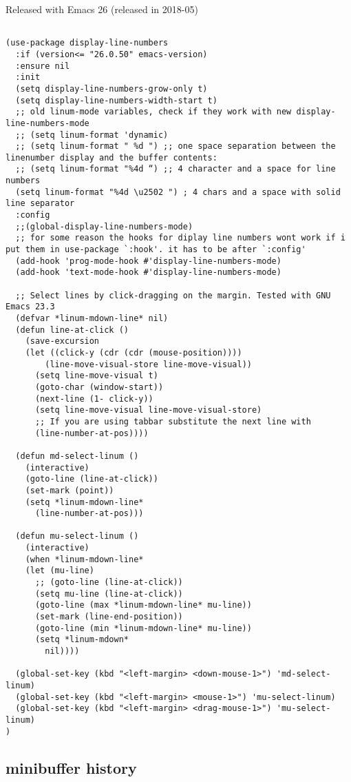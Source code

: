 \documentclass[11pt]{article}
\begin{document}
Released with Emacs 26 (released in 2018-05)
\begin{verbatim}

(use-package display-line-numbers
  :if (version<= "26.0.50" emacs-version)
  :ensure nil
  :init
  (setq display-line-numbers-grow-only t)
  (setq display-line-numbers-width-start t)
  ;; old linum-mode variables, check if they work with new display-line-numbers-mode
  ;; (setq linum-format 'dynamic)
  ;; (setq linum-format " %d ") ;; one space separation between the linenumber display and the buffer contents:
  ;; (setq linum-format "%4d “) ;; 4 character and a space for line numbers
  (setq linum-format "%4d \u2502 ") ; 4 chars and a space with solid line separator
  :config
  ;;(global-display-line-numbers-mode)
  ;; for some reason the hooks for diplay line numbers wont work if i put them in use-package `:hook'. it has to be after `:config'
  (add-hook 'prog-mode-hook #'display-line-numbers-mode)
  (add-hook 'text-mode-hook #'display-line-numbers-mode)

  ;; Select lines by click-dragging on the margin. Tested with GNU Emacs 23.3
  (defvar *linum-mdown-line* nil)
  (defun line-at-click ()
    (save-excursion
    (let ((click-y (cdr (cdr (mouse-position))))
        (line-move-visual-store line-move-visual))
      (setq line-move-visual t)
      (goto-char (window-start))
      (next-line (1- click-y))
      (setq line-move-visual line-move-visual-store)
      ;; If you are using tabbar substitute the next line with
      (line-number-at-pos))))

  (defun md-select-linum ()
    (interactive)
    (goto-line (line-at-click))
    (set-mark (point))
    (setq *linum-mdown-line*
      (line-number-at-pos)))

  (defun mu-select-linum ()
    (interactive)
    (when *linum-mdown-line*
    (let (mu-line)
      ;; (goto-line (line-at-click))
      (setq mu-line (line-at-click))
      (goto-line (max *linum-mdown-line* mu-line))
      (set-mark (line-end-position))
      (goto-line (min *linum-mdown-line* mu-line))
      (setq *linum-mdown*
        nil))))

  (global-set-key (kbd "<left-margin> <down-mouse-1>") 'md-select-linum)
  (global-set-key (kbd "<left-margin> <mouse-1>") 'mu-select-linum)
  (global-set-key (kbd "<left-margin> <drag-mouse-1>") 'mu-select-linum)
)

\end{verbatim}

\subsection*{minibuffer history}
\label{sec:org42b3f35}
\end{document}
